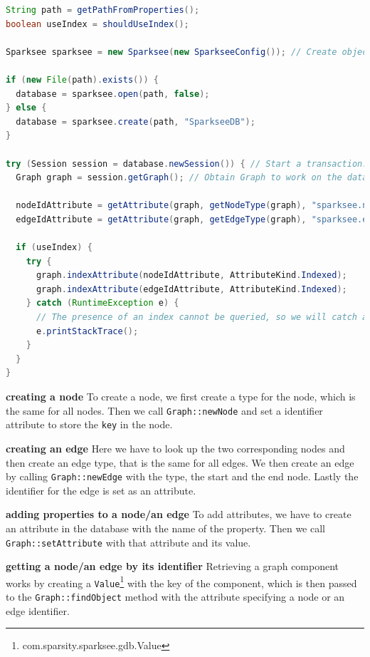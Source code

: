 \begin{lstlisting}[language=Java,label={lst:sparkseeInit},caption={Implementation of the initialisation and starting of a session.},captionpos=b]
String path = getPathFromProperties();
boolean useIndex = shouldUseIndex();

Sparksee sparksee = new Sparksee(new SparkseeConfig()); // Create object for database access.

if (new File(path).exists()) {
  database = sparksee.open(path, false);
} else {
  database = sparksee.create(path, "SparkseeDB");
}

try (Session session = database.newSession()) { // Start a transaction. The try-with-resource block closes the session automatically at the end.
  Graph graph = session.getGraph(); // Obtain Graph to work on the database.

  nodeIdAttribute = getAttribute(graph, getNodeType(graph), "sparksee.nodeId");
  edgeIdAttribute = getAttribute(graph, getEdgeType(graph), "sparksee.edgeId");

  if (useIndex) {
    try {
      graph.indexAttribute(nodeIdAttribute, AttributeKind.Indexed);
      graph.indexAttribute(edgeIdAttribute, AttributeKind.Indexed);
    } catch (RuntimeException e) {
      // The presence of an index cannot be queried, so we will catch and ignore the exception that is thrown when an index already exists.
      e.printStackTrace();
    }
  }
}
\end{lstlisting}

\textbf{creating a node} \newline
To create a node,
we first create a type for the node,
which is the same for all nodes.
Then we call \texttt{Graph::newNode} and set a identifier attribute to store the \texttt{key} in the node.

\textbf{creating an edge} \newline
Here we have to look up the two corresponding nodes and then create an edge type,
that is the same for all edges.
We then create an edge by calling \texttt{Graph::newEdge} with the type,
the start and the end node.
Lastly the identifier for the edge is set as an attribute.

\textbf{adding properties to a node/an edge} \newline
To add attributes,
we have to create an attribute in the database with the name of the property.
Then we call \texttt{Graph::setAttribute} with that attribute and its value.

\textbf{getting a node/an edge by its identifier} \newline
Retrieving a graph component works by creating a \texttt{Value}\footnote{com.sparsity.sparksee.gdb.Value} with the key of the component,
which is then passed to the \texttt{Graph::findObject} method with the attribute specifying a node or an edge identifier.

